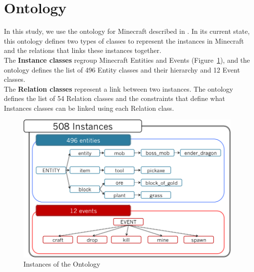 \documentclass[twocolumn]{article}
\begin{document}


\section{Ontology}

In this study, we use the ontology for Minecraft described in \cite{dumont2016ontology}. In its current state, this ontology defines two types of classes to represent the instances in Minecraft and the relations that links these instances together.\\
The \textbf{Instance classes} regroup Minecraft Entities and Events (Figure~\ref{entitiesAndEvents}), and the ontology defines the list of 496 Entity classes and their hierarchy and 12 Event classes.\\
The \textbf{Relation classes} represent a link between two instances. The ontology defines the list of 54 Relation classes and the constraints that define what Instances classes can be linked using each Relation class.

\begin{figure}[t]
   \centering \includegraphics[width=\linewidth]{Figures/Knowledge/entitiesAndEvents.png}
   \caption{\label{entitiesAndEvents} Instances of the Ontology}
\end{figure}
\end{document}
